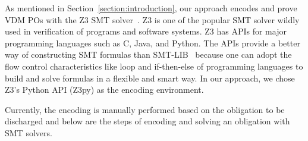 
As mentioned in Section~\ref{section:introduction}, our approach encodes and prove VDM POs with the Z3 SMT solver~\cite{MB:08:ZSS}. Z3 is one of the popular SMT solver wildly used in verification of programs and software systems. Z3 has APIs for major programming languages such as C, Java, and Python. The APIs provide a better way of constructing SMT formulas than SMT-LIB~\cite{BarFT-SMTLIB} because one can adopt the flow control characteristics like loop and if-then-else of programming languages to build and solve formulas in a flexible and smart way. In our approach, we chose Z3's Python API (Z3py) as the encoding environment. 

Currently, the encoding is manually performed based on the obligation to be discharged and below are the steps of encoding and solving an obligation with SMT solvers.

